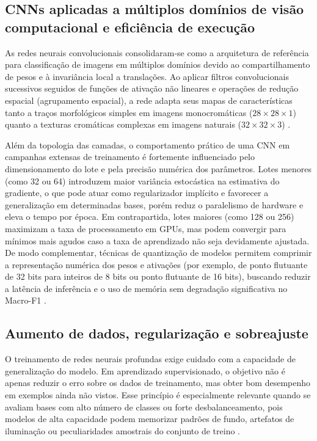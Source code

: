 \documentclass[
    12pt,
    openright,
    oneside,
    a4paper,
    english,
    brazil
]{abntex2}
\begin{document}
\subsection{CNNs aplicadas a múltiplos domínios de visão computacional e eficiência de execução}

As redes neurais convolucionais consolidaram-se como a arquitetura de referência para classificação de imagens em múltiplos domínios devido ao compartilhamento de pesos e à invariância local a translações. Ao aplicar filtros convolucionais sucessivos seguidos de funções de ativação não lineares e operações de redução espacial (agrupamento espacial), a rede adapta seus mapas de características tanto a traços morfológicos simples em imagens monocromáticas (\(28 \times 28 \times 1\)) quanto a texturas cromáticas complexas em imagens naturais (\(32 \times 32 \times 3\)) \cite{LeCun2015,goodfellow2016deep}.

Além da topologia das camadas, o comportamento prático de uma CNN em campanhas extensas de treinamento é fortemente influenciado pelo dimensionamento do lote e pela precisão numérica dos parâmetros. Lotes menores (como 32 ou 64) introduzem maior variância estocástica na estimativa do gradiente, o que pode atuar como regularizador implícito e favorecer a generalização em determinadas bases, porém reduz o paralelismo de hardware e eleva o tempo por época. Em contrapartida, lotes maiores (como 128 ou 256) maximizam a taxa de processamento em GPUs, mas podem convergir para mínimos mais agudos caso a taxa de aprendizado não seja devidamente ajustada. De modo complementar, técnicas de quantização de modelos permitem comprimir a representação numérica dos pesos e ativações (por exemplo, de ponto flutuante de 32 bits para inteiros de 8 bits ou ponto flutuante de 16 bits), buscando reduzir a latência de inferência e o uso de memória sem degradação significativa no Macro-F1 \cite{goodfellow2016deep,zandieh2025turboquant}.

\subsection{Aumento de dados, regularização e sobreajuste}
\label{subsec:aumento_regularizacao_overfitting}

O treinamento de redes neurais profundas exige cuidado com a capacidade de generalização do modelo. Em aprendizado supervisionado, o objetivo não é apenas reduzir o erro sobre os dados de treinamento, mas obter bom desempenho em exemplos ainda não vistos. Esse princípio é especialmente relevante quando se avaliam bases com alto número de classes ou forte desbalanceamento, pois modelos de alta capacidade podem memorizar padrões de fundo, artefatos de iluminação ou peculiaridades amostrais do conjunto de treino \cite{goodfellow2016deep}.
\end{document}
